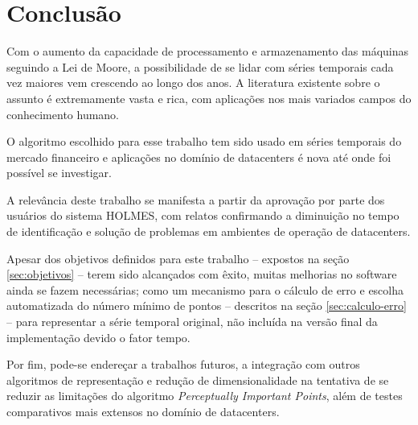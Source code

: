 \chapter{Conclusão}
\label{chap:conclusao}
Com o aumento da capacidade de processamento e armazenamento das máquinas seguindo a Lei de Moore, a possibilidade de se lidar com séries temporais cada vez maiores vem crescendo ao longo dos anos. A literatura existente sobre o assunto é extremamente vasta e rica, com aplicações nos mais variados campos do conhecimento humano.

O algoritmo escolhido para esse trabalho tem sido usado em séries temporais do mercado financeiro e aplicações no domínio de datacenters é nova até onde foi possível se investigar.

A relevância deste trabalho se manifesta a partir da aprovação por parte dos usuários do sistema HOLMES, com relatos confirmando a diminuição no tempo de identificação e solução de problemas em ambientes de operação de datacenters.

Apesar dos objetivos definidos para este trabalho -- expostos na seção \ref{sec:objetivos} -- terem sido alcançados com êxito, muitas melhorias no software ainda se fazem necessárias; como um mecanismo para o cálculo de erro e escolha automatizada do número mínimo de pontos -- descritos na seção \ref{sec:calculo-erro} -- para representar a série temporal original, não incluída na versão final da implementação devido o fator tempo. 

Por fim, pode-se endereçar a trabalhos futuros, a integração com outros algoritmos de representação e redução de dimensionalidade na tentativa de se reduzir as limitações do algoritmo \textit{Perceptually Important Points}, além de testes comparativos mais extensos no domínio de datacenters.
